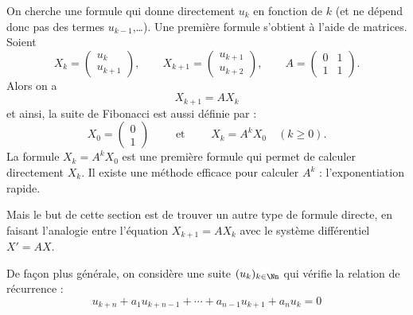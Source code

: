 \documentclass[12pt, class=report,crop=false]{standalone}
\begin{document}
On cherche une formule qui donne directement $u_k$ en fonction de $k$ (et ne dépend donc pas des termes $u_{k-1}$,\ldots).
Une première formule s'obtient à l'aide de matrices.
Soient
$$X_k =  \begin{pmatrix}u_k \\ u_{k+1}\end{pmatrix}, \qquad X_{k+1} =  \begin{pmatrix}u_{k+1} \\ u_{k+2}\end{pmatrix},
\qquad A = \begin{pmatrix}0&1\\1&1\end{pmatrix}.$$
Alors on a 
$$X_{k+1} = A X_k$$
et ainsi, la suite de Fibonacci est aussi définie par :
$$X_0 = \begin{pmatrix}0\\1\end{pmatrix} \qquad \text{ et } \qquad X_k = A^k X_0 \quad (k\ge0).$$
La formule $X_k = A^k X_0$ est une première formule qui permet de calculer directement $X_k$. Il existe une méthode efficace pour calculer $A^k$ : l'exponentiation rapide. 

Mais le but de cette section est de trouver un autre type de formule directe, en faisant l'analogie entre
l'équation $X_{k+1} = A X_k$ avec le système différentiel $X'=AX$.

De façon plus générale, on considère une suite $(u_k)_{k \in \Nn}$ qui vérifie la relation de récurrence :
\begin{equation}
u_{k+n} + a_1 u_{k+n-1}+ \cdots+ a_{n-1}u_{k+1} +a_n u_k=0
\label{eq:eqrec}\tag{$E$}
\end{equation}
\end{document}
